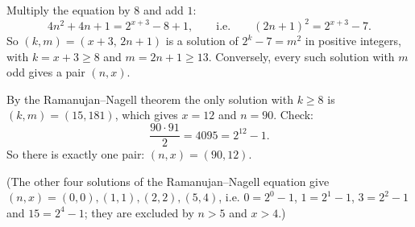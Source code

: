 Multiply the equation by $8$ and add $1$:
\[4n^2+4n+1=2^{x+3}-8+1,\qquad\text{i.e.}\qquad(2n+1)^2=2^{x+3}-7.\]
So $(k,m)=(x+3,\,2n+1)$ is a solution of $2^k-7=m^2$ in positive integers, with $k=x+3\ge8$ and $m=2n+1\ge13$. Conversely, every such solution with $m$ odd gives a pair $(n,x)$.

By the Ramanujan--Nagell theorem the only solution with $k\ge8$ is $(k,m)=(15,181)$, which gives $x=12$ and $n=90$. Check:
\[\dfrac{90\cdot91}{2}=4095=2^{12}-1.\]
So there is exactly one pair: $\boxed{(n,x)=(90,12)}$.

(The other four solutions of the Ramanujan--Nagell equation give $(n,x)=(0,0),(1,1),(2,2),(5,4)$, i.e. $0=2^0-1$, $1=2^1-1$, $3=2^2-1$ and $15=2^4-1$; they are excluded by $n>5$ and $x>4$.)
